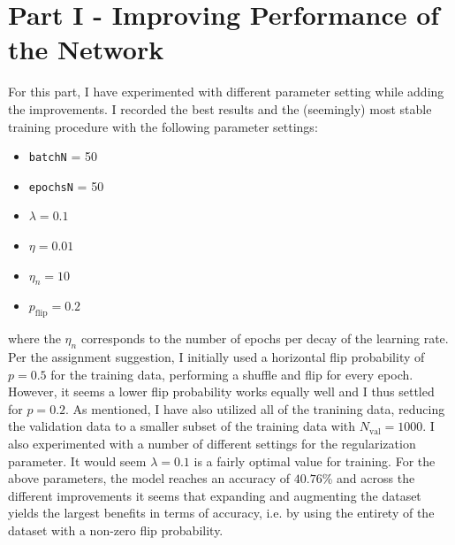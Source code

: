 \documentclass{article}
\begin{document}
\section*{Part I - Improving Performance of the Network}
	For this part, I have experimented with different parameter setting while adding the improvements. I recorded the best results and the (seemingly) most stable training procedure with the following parameter settings:
	\begin{itemize}
		\item \texttt{batchN} = 50
		\item \texttt{epochsN} = 50
		\item $\lambda = 0.1$
		\item $\eta = 0.01$
		\item $\eta_n = 10$
		\item $p_{\text{flip}} = 0.2$
	\end{itemize}
	where the $\eta_n$ corresponds to the number of epochs per decay of the learning rate. Per the assignment suggestion, I initially used a horizontal flip probability of $p = 0.5$ for the training data, performing a shuffle and flip for every epoch. However, it seems a lower flip probability works equally well and I thus settled for $p = 0.2$. As mentioned, I have also utilized all of the tranining data, reducing the validation data to a smaller subset of the training data with $N_{\text{val}} = 1000$. I also experimented with a number of different settings for the regularization parameter. It would seem $\lambda = 0.1$ is a fairly optimal value for training. For the above parameters, the model reaches an accuracy of $40.76$\% and across the different improvements it seems that expanding and augmenting the dataset yields the largest benefits in terms of accuracy, i.e. by using the entirety of the dataset with a non-zero flip probability.
\end{document}
